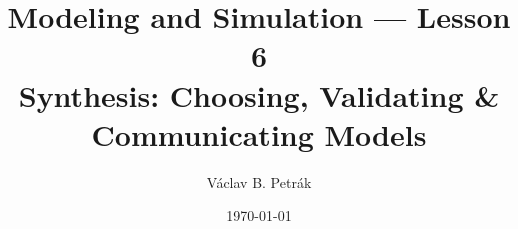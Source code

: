\documentclass[11pt]{beamer}
\title{
Modeling and Simulation --- Lesson 6\\
\textbf{Synthesis: Choosing, Validating \& Communicating Models}}
\author{Václav B. Petrák}
\institute{Faculty of Biomedical Engineering\\
Czech Technical University}
\date{\today}
\begin{document}
\begin{frame}
  \titlepage
\end{frame}




\end{document}

